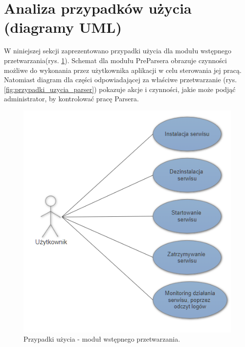 \documentclass[a4paper]{book}
\begin{document}
\section{Analiza przypadków użycia (diagramy UML)}
W niniejszej sekcji zaprezentowano przypadki użycia dla modułu wstępnego przetwarzania(rys. \ref{fig:przypadki_uzycia_preparser}). Schemat dla modułu PreParsera obrazuje czynności możliwe do wykonania przez użytkownika aplikacji w celu sterowania jej pracą. Natomiast diagram dla części odpowiadającej za właściwe przetwarzanie (rys. \ref{fig:przypadki_uzycia_parser}) pokazuje akcje i czynności, jakie może podjąć administrator, by kontrolować pracę Parsera.
\begin{figure}[t]
	\centering
	\includegraphics{./img/przypadki_uzycia_preparser.png}
	\caption{Przypadki użycia - moduł wstępnego przetwarzania.}
	\label{fig:przypadki_uzycia_preparser}
\end{figure}
\end{document}
